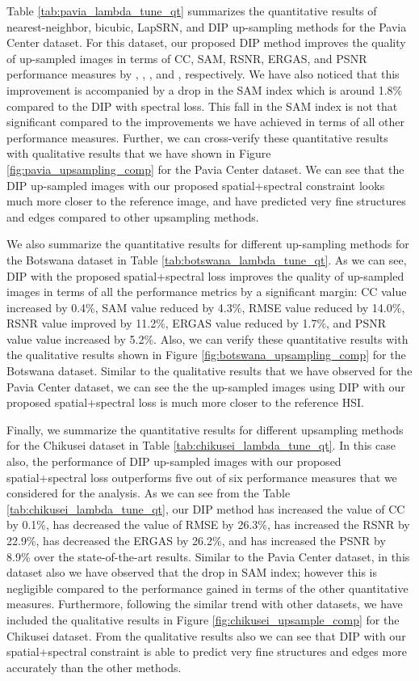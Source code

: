 \documentclass[journal]{IEEEtran}
\begin{document}
    Table \ref{tab:pavia_lambda_tune_qt} summarizes the quantitative results of nearest-neighbor, bicubic, LapSRN, and DIP up-sampling methods for the Pavia Center dataset. For this dataset, our proposed DIP method improves the quality of up-sampled images in terms of CC, SAM, RSNR, ERGAS, and PSNR performance measures by , ,  , and , respectively. We have also noticed that this improvement is accompanied by a drop in the SAM index which is around 1.8\% compared to the DIP with spectral loss. This fall in the SAM index is not that significant compared to the improvements we have achieved in terms of all other performance measures. Further, we can cross-verify these quantitative results with qualitative results that we have shown in Figure \ref{fig:pavia_upsampling_comp} for the Pavia Center dataset. We can see that the DIP up-sampled images with our proposed spatial+spectral constraint looks much more closer to the reference image, and have predicted very fine structures and edges compared to other upsampling methods. 
    
    We also summarize the quantitative results for different up-sampling methods for the Botswana dataset in Table \ref{tab:botswana_lambda_tune_qt}. As we can see, DIP with the proposed spatial+spectral loss improves the quality of up-sampled images in terms of all the performance metrics by a significant margin: CC value increased by 0.4\%, SAM value reduced by 4.3\%, RMSE value reduced by 14.0\%, RSNR value improved by 11.2\%, ERGAS value reduced by 1.7\%, and PSNR value value increased by 5.2\%. Also, we can verify these quantitative results with the qualitative results shown in Figure \ref{fig:botswana_upsampling_comp} for the Botswana dataset. Similar to the qualitative results that we have observed for the Pavia Center dataset, we can see the the up-sampled images using DIP with our proposed spatial+spectral loss is much more closer to the reference HSI. 
    
    Finally, we summarize the quantitative results for different upsampling methods for the Chikusei dataset in Table \ref{tab:chikusei_lambda_tune_qt}. In this case also, the performance of DIP up-sampled images with our proposed spatial+spectral loss outperforms five out of six performance measures that we considered for the analysis. As we can see from the Table  \ref{tab:chikusei_lambda_tune_qt}, our DIP method has increased the value of CC by 0.1\%, has decreased the value of RMSE by 26.3\%, has increased the RSNR by 22.9\%, has decreased the ERGAS by 26.2\%, and has increased the PSNR by 8.9\% over the state-of-the-art results. Similar to the Pavia Center dataset, in this dataset also we have observed that the drop in SAM index; however this is negligible compared to the performance gained in terms of the other quantitative measures. Furthermore, following the similar trend with other datasets, we have included the qualitative results in Figure \ref{fig:chikusei_upsample_comp} for the Chikusei dataset. From the qualitative results also we can see that  DIP with our spatial+spectral constraint is able to predict very fine structures and edges more accurately than the other methods. 
    
\end{document}
